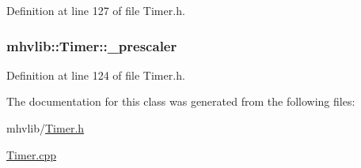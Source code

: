 Definition at line 127 of file Timer.\-h.

\hypertarget{classmhvlib_1_1_timer_a966e0dbbf5f9e7b784ee99d737cb4dcc}{
\subsubsection[{\-\_\-prescaler}]{ mhvlib\-::\-Timer\-::\-\_\-prescaler\hspace{0.3cm}{\ttfamily [protected]}}}\label{classmhvlib_1_1_timer_a966e0dbbf5f9e7b784ee99d737cb4dcc}


Definition at line 124 of file Timer.\-h.



The documentation for this class was generated from the following files\-:\begin{DoxyCompactItemize}
\item 
mhvlib/\hyperlink{_timer_8h}{Timer.\-h}\item 
\hyperlink{_timer_8cpp}{Timer.\-cpp}\end{DoxyCompactItemize}
